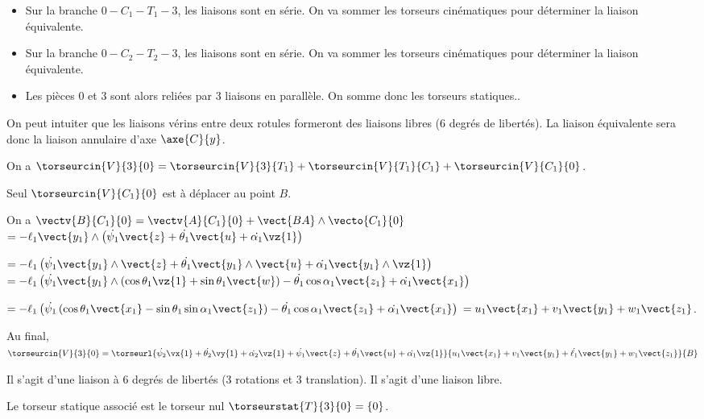 \ifprof
\begin{corrige}
\begin{itemize}
\item Sur la branche $0 - C_1 - T_1 - 3$, les liaisons sont en série. On va sommer les torseurs cinématiques pour déterminer la liaison équivalente.
\item Sur la branche $0 - C_2 - T_2 - 3$, les liaisons sont en série. On va sommer les torseurs cinématiques pour déterminer la liaison équivalente.
\item Les pièces 0 et 3 sont alors reliées par 3 liaisons en parallèle. On somme donc les torseurs statiques.. 
\end{itemize}

On peut intuiter que les liaisons vérins entre deux rotules formeront des liaisons libres (6 degrés de libertés). La liaison équivalente sera donc la liaison annulaire d'axe $\axe{C}{y}$.
\end{corrige}
\else
\fi



\ifprof
\begin{corrige}
On a $\torseurcin{V}{3}{0} = \torseurcin{V}{3}{T_1} + \torseurcin{V}{T_1}{C_1} + \torseurcin{V}{C_1}{0}$.
 
Seul $\torseurcin{V}{C_1}{0}$ est à déplacer au point $B$. 

On a $\vectv{B}{C_1}{0} = \vectv{A}{C_1}{0} + \vect{BA}\wedge \vecto{C_1}{0}$ 
$ = -\ell_1\vect{y_1}\wedge \left( \dot{\psi_1} \vect{z}+\dot{\theta_1} \vect{u}+\dot{\alpha_1} \vz{1}\right)$ 

$ = -\ell_1 \left( \dot{\psi_1} \vect{y_1}\wedge \vect{z}+\dot{\theta_1}\vect{y_1}\wedge \vect{u}+\dot{\alpha_1} \vect{y_1}\wedge\vz{1}\right)$ 
$ = -\ell_1 \left( \dot{\psi_1} \vect{y_1}\wedge \left( \cos\theta_1\vz{1}+\sin\theta_1\vect{w} \right)-\dot{\theta_1}\cos\alpha_1  \vect{z_1}+\dot{\alpha_1} \vect{x_1}\right)$ 

$ = -\ell_1 \left( \dot{\psi_1} \left( \cos\theta_1 \vect{x_1} - \sin\theta_1 \sin\alpha_1\vect{z_1} \right)-\dot{\theta_1}\cos\alpha_1  \vect{z_1}+\dot{\alpha_1} \vect{x_1}\right)$ 
$ = u_1 \vect{x_1}+v_1 \vect{y_1}+w_1 \vect{z_1}$.


Au final, 
$\torseurcin{V}{3}{0} = 
\torseurl{\dot{\psi_2} \vx{1}+\dot{\theta_2} \vy{1}+\dot{\alpha_2} \vz{1} + \dot{\psi_1} \vect{z}+\dot{\theta_1} \vect{u}+\dot{\alpha_1} \vz{1}}{u_1 \vect{x_1}+v_1 \vect{y_1}+\dot{\ell_1} \vect{y_1}+w_1 \vect{z_1}}{B}
$

Il s'agit d'une liaison à 6 degrés de libertés (3 rotations et 3 translation). Il s'agit d'une liaison libre. 


Le torseur statique associé est le torseur nul $\torseurstat{T}{3}{0} = \left\{0 \right\}$.
\end{corrige}
\else
\fi

